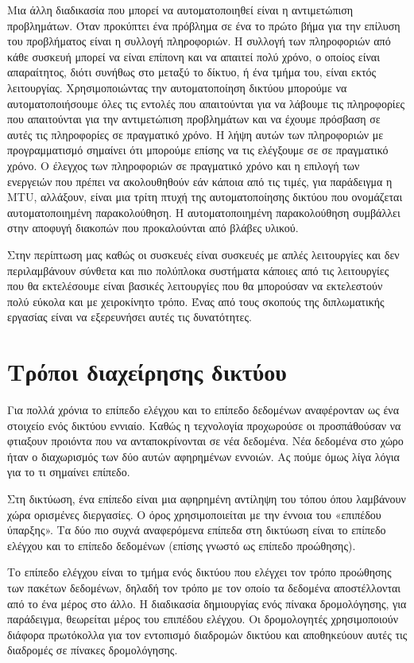 Μια άλλη διαδικασία που μπορεί να αυτοματοποιηθεί είναι η αντιμετώπιση προβλημάτων. Όταν προκύπτει ένα πρόβλημα σε ένα 
το πρώτο βήμα για την επίλυση του προβλήματος είναι η συλλογή πληροφοριών. Η συλλογή των πληροφοριών από κάθε συσκευή μπορεί να είναι επίπονη και να απαιτεί πολύ χρόνο, ο οποίος είναι απαραίτητος, διότι συνήθως στο μεταξύ το δίκτυο, ή ένα τμήμα του, είναι εκτός λειτουργίας.
Χρησιμοποιώντας την αυτοματοποίηση δικτύου μπορούμε να αυτοματοποιήσουμε όλες τις εντολές που απαιτούνται για να λάβουμε τις πληροφορίες που απαιτούνται για την αντιμετώπιση προβλημάτων και να έχουμε πρόσβαση σε αυτές τις πληροφορίες σε πραγματικό χρόνο.
Η λήψη αυτών των πληροφοριών με προγραμματισμό σημαίνει ότι μπορούμε επίσης να τις ελέγξουμε σε  σε πραγματικό χρόνο. Ο έλεγχος των πληροφοριών σε πραγματικό χρόνο και η 
επιλογή των ενεργειών που πρέπει να ακολουθηθούν εάν κάποια από τις τιμές, για παράδειγμα η MTU, αλλάξουν, 
είναι μια τρίτη πτυχή της αυτοματοποίησης δικτύου που ονομάζεται αυτοματοποιημένη παρακολούθηση.
Η αυτοματοποιημένη παρακολούθηση συμβάλλει στην αποφυγή διακοπών που προκαλούνται από βλάβες υλικού.

Στην περίπτωση μας καθώς οι συσκευές είναι συσκευές με απλές λειτουργίες και δεν περιλαμβάνουν σύνθετα και πιο πολύπλοκα συστήματα κάποιες από τις λειτουργίες
που θα εκτελέσουμε είναι βασικές λειτουργίες που θα μπορούσαν να εκτελεστούν πολύ εύκολα και με χειροκίνητο τρόπο. Ένας από τους σκοπούς της διπλωματικής εργασίας
είναι να εξερευνήσει αυτές τις δυνατότητες.

\section{Τρόποι διαχείρησης δικτύου}
Για πολλά χρόνια το επίπεδο ελέγχου και το επίπεδο δεδομένων αναφέρονταν ως ένα στοιχείο ενός δικτύου εννιαίο. Καθώς η τεχνολογία προχωρούσε οι 
προσπάθούσαν να φτιαξουν προιόντα που να ανταποκρίνονται σε νέα δεδομένα. Νέα δεδομένα στο χώρο ήταν ο διαχωρισμός των δύο αυτών αφηρημένων εννοιών.
Ας πούμε όμως λίγα λόγια για το τι σημαίνει επίπεδο. 

Στη δικτύωση, ένα επίπεδο είναι μια αφηρημένη αντίληψη του τόπου όπου λαμβάνουν χώρα ορισμένες διεργασίες. 
Ο όρος χρησιμοποιείται με την έννοια του «επιπέδου ύπαρξης». Τα δύο πιο συχνά αναφερόμενα επίπεδα στη δικτύωση είναι το επίπεδο ελέγχου 
και το επίπεδο δεδομένων (επίσης γνωστό ως επίπεδο προώθησης). 

Το επίπεδο ελέγχου είναι το τμήμα ενός δικτύου που ελέγχει τον τρόπο προώθησης των πακέτων δεδομένων, 
δηλαδή τον τρόπο με τον οποίο τα δεδομένα αποστέλλονται από το ένα μέρος στο άλλο. 
Η διαδικασία δημιουργίας ενός πίνακα δρομολόγησης, για παράδειγμα, θεωρείται μέρος του επιπέδου ελέγχου. 
Οι δρομολογητές χρησιμοποιούν διάφορα πρωτόκολλα για τον εντοπισμό διαδρομών δικτύου και αποθηκεύουν αυτές τις διαδρομές σε πίνακες δρομολόγησης.

